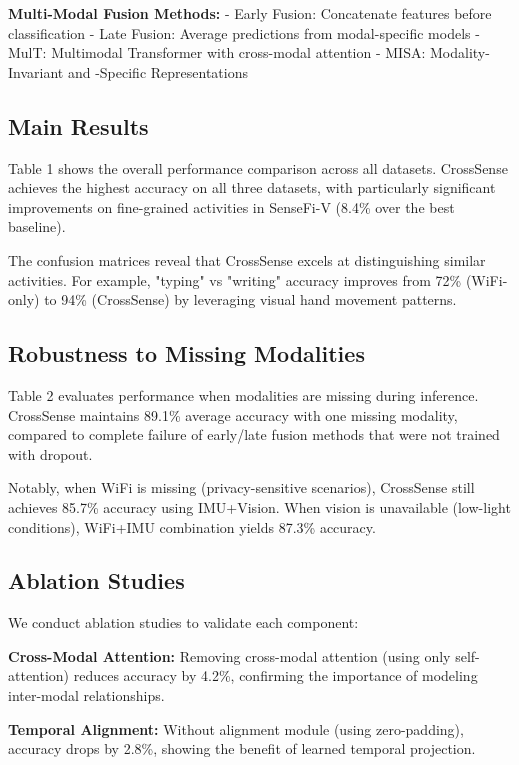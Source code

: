 \documentclass[10pt,twocolumn]{article}
\begin{document}
\textbf{Multi-Modal Fusion Methods:}
- Early Fusion: Concatenate features before classification
- Late Fusion: Average predictions from modal-specific models
- MulT: Multimodal Transformer with cross-modal attention
- MISA: Modality-Invariant and -Specific Representations

\subsection{Main Results}

Table 1 shows the overall performance comparison across all datasets. CrossSense achieves the highest accuracy on all three datasets, with particularly significant improvements on fine-grained activities in SenseFi-V (8.4\% over the best baseline).

The confusion matrices reveal that CrossSense excels at distinguishing similar activities. For example, "typing" vs "writing" accuracy improves from 72\% (WiFi-only) to 94\% (CrossSense) by leveraging visual hand movement patterns.

\subsection{Robustness to Missing Modalities}

Table 2 evaluates performance when modalities are missing during inference. CrossSense maintains 89.1\% average accuracy with one missing modality, compared to complete failure of early/late fusion methods that were not trained with dropout.

Notably, when WiFi is missing (privacy-sensitive scenarios), CrossSense still achieves 85.7\% accuracy using IMU+Vision. When vision is unavailable (low-light conditions), WiFi+IMU combination yields 87.3\% accuracy.

\subsection{Ablation Studies}

We conduct ablation studies to validate each component:

\textbf{Cross-Modal Attention:} Removing cross-modal attention (using only self-attention) reduces accuracy by 4.2\%, confirming the importance of modeling inter-modal relationships.

\textbf{Temporal Alignment:} Without alignment module (using zero-padding), accuracy drops by 2.8\%, showing the benefit of learned temporal projection.
\end{document}
